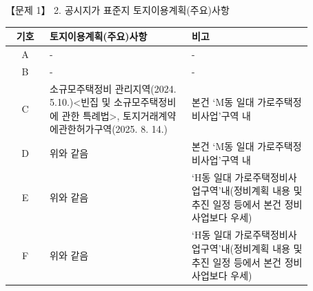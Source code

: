 \begin{longquestion}{【문제 1】}
2. 공시지가 표준지 토지이용계획(주요)사항 \par
{\small\centering\setlength{\tabcolsep}{3pt}
\begin{tabular}{|c|>{\centering\arraybackslash}p{0.47\linewidth}|>{\centering\arraybackslash}p{0.40\linewidth}|}
\hline
기호 & 토지이용계획(주요)사항 & 비고 \\
\hline
A & - & - \\
\hline
B & - & - \\
\hline
C & 소규모주택정비 관리지역(2024. 5.\newline{}10.)<빈집 및 소규모주택정비에 관한 특례법>, 토지거래계약에관한허가구역(2025. 8. 14.) & 본건 ‘M동 일대 가로주택정비사업’\newline{}구역 내 \\
\hline
D & 위와 같음 & 본건 ‘M동 일대 가로주택정비사업’\newline{}구역 내 \\
\hline
E & 위와 같음 & ‘H동 일대 가로주택정비사업구역’\newline{}내(정비계획 내용 및 추진 일정 등에서 본건 정비사업보다 우세) \\
\hline
F & 위와 같음 & ‘H동 일대 가로주택정비사업구역’\newline{}내(정비계획 내용 및 추진 일정 등에서 본건 정비사업보다 우세) \\
\hline
\end{tabular}\par}


\end{longquestion}
